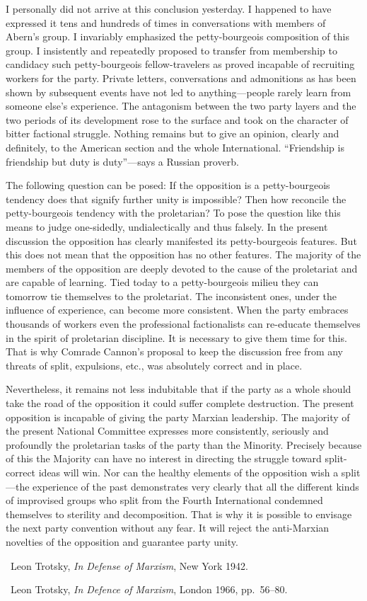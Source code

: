 I personally did not arrive at this conclusion yesterday. I happened to have expressed it tens and hundreds of times in conversations with members of Abern’s group. I invariably emphasized the petty-bourgeois composition of this group. I insistently and repeatedly proposed to transfer from membership to candidacy such petty-bourgeois fellow-travelers as proved incapable of recruiting workers for the party. Private letters, conversations and admonitions as has been shown by subsequent events have not led to anything---people rarely learn from someone else’s experience. The antagonism between the two party layers and the two periods of its development rose to the surface and took on the character of bitter factional struggle. Nothing remains but to give an opinion, clearly and definitely, to the American section and the whole International. “Friendship is friendship but duty is duty”---says a Russian proverb.

The following question can be posed: If the opposition is a petty-bourgeois tendency does that signify further unity is impossible? Then how reconcile the petty-bourgeois tendency with the proletarian? To pose the question like this means to judge one-sidedly, undialectically and thus falsely. In the present discussion the opposition has clearly manifested its petty-bourgeois features. But this does not mean that the opposition has no other features. The majority of the members of the opposition are deeply devoted to the cause of the proletariat and are capable of learning. Tied today to a petty-bourgeois milieu they can tomorrow tie themselves to the proletariat. The inconsistent ones, under the influence of experience, can become more consistent. When the party embraces thousands of workers even the professional factionalists can re-educate themselves in the spirit of proletarian discipline. It is necessary to give them time for this. That is why Comrade Cannon’s proposal to keep the discussion free from any threats of split, expulsions, etc., was absolutely correct and in place.
\noclub

Nevertheless, it remains not less indubitable that if the party as a whole should take the road of the opposition it could suffer complete destruction. The present opposition is incapable of giving the party Marxian leadership. The majority of the present National Committee expresses more consistently, seriously and profoundly the proletarian tasks of the party than the Minority. Precisely because of this the Majority can have no interest in directing the struggle toward split-correct ideas will win. Nor can the healthy elements of the opposition wish a split---the experience of the past demonstrates very clearly that all the different kinds of improvised groups who split from the Fourth International condemned themselves to sterility and decomposition. That is why it is possible to envisage the next party convention without any fear. It will reject the anti-Marxian novelties of the opposition and guarantee party unity.

\begin{letterinfo}
  \firstpublished\ Leon Trotsky, \emph{In Defense of Marxism}, New York 1942.
  
  \checkedagainst\ Leon Trotsky, \emph{In Defence of Marxism}, London 1966, pp.~56--80.
\end{letterinfo}